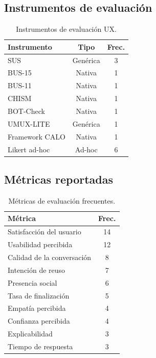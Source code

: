 \documentclass[11pt,twocolumn]{article}
\begin{document}
\subsection{Instrumentos de evaluación}

\begin{table}[H]
\centering
\caption{Instrumentos de evaluación UX.}
\label{tab:instrumentos}
\begin{tabular}{@{}lcc@{}}
\toprule
\textbf{Instrumento} & \textbf{Tipo} & \textbf{Frec.} \\
\midrule
SUS & Genérica & 3 \\
BUS-15 & Nativa & 1 \\
BUS-11 & Nativa & 1 \\
CHISM & Nativa & 1 \\
BOT-Check & Nativa & 1 \\
UMUX-LITE & Genérica & 1 \\
Framework CALO & Nativa & 1 \\
Likert ad-hoc & Ad-hoc & 6 \\
\bottomrule
\end{tabular}
\end{table}

\subsection{Métricas reportadas}

\begin{table}[H]
\centering
\caption{Métricas de evaluación frecuentes.}
\label{tab:metricas}
\begin{tabular}{@{}lc@{}}
\toprule
\textbf{Métrica} & \textbf{Frec.} \\
\midrule
Satisfacción del usuario & 14 \\
Usabilidad percibida & 12 \\
Calidad de la conversación & 8 \\
Intención de reuso & 7 \\
Presencia social & 6 \\
Tasa de finalización & 5 \\
Empatía percibida & 4 \\
Confianza percibida & 4 \\
Explicabilidad & 3 \\
Tiempo de respuesta & 3 \\
\bottomrule
\end{tabular}
\end{table}
\end{document}
